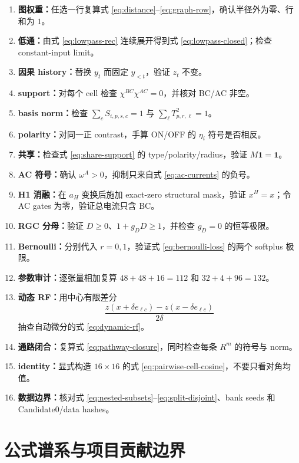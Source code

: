 \documentclass[UTF8,12pt,a4paper]{ctexart}
\numberwithin{equation}{section}
\newcommand{\vect}[1]{\bm{#1}}
\begin{document}
\begin{enumerate}[label=\textbf{V\arabic*.}]
\item \textbf{图权重：}任选一行复算式 \eqref{eq:distance}--\eqref{eq:graph-row}，确认半径外为零、行和为 $1$。
\item \textbf{低通：}由式 \eqref{eq:lowpass-rec} 连续展开得到式 \eqref{eq:lowpass-closed}；检查 constant-input limit。
\item \textbf{因果 history：}替换 $y_t$ 而固定 $y_{<t}$，验证 $z_t$ 不变。
\item \textbf{support：}对每个 cell 检查 $\chi^{BC}\chi^{AC}=0$，并核对 BC/AC 非空。
\item \textbf{basis norm：}检查 $\sum_cS_{i,p,s,c}=1$ 与 $\sum_\ell T_{p,r,\ell}^2=1$。
\item \textbf{polarity：}对同一正 contrast，手算 ON/OFF 的 $\eta_i$ 符号是否相反。
\item \textbf{共享：}检查式 \eqref{eq:share-support} 的 type/polarity/radius，验证 $M\vect1=\vect1$。
\item \textbf{AC 符号：}确认 $\omega^A>0$，抑制只来自式 \eqref{eq:ac-currents} 的负号。
\item \textbf{H1 消融：}在 $a_H$ 变换后施加 exact-zero structural mask，验证 $x^H=x$；令 AC gates 为零，验证总电流只含 BC。
\item \textbf{RGC 分母：}验证 $D\ge0$、$1+g_DD\ge1$，并检查 $g_D=0$ 的恒等极限。
\item \textbf{Bernoulli：}分别代入 $r=0,1$，验证式 \eqref{eq:bernoulli-loss} 的两个 softplus 极限。
\item \textbf{参数审计：}逐张量相加复算 $48+48+16=112$ 和 $32+4+96=132$。
\item \textbf{动态 RF：}用中心有限差分
\[
\frac{z(x+\delta e_{\ell c})-z(x-\delta e_{\ell c})}{2\delta}
\]
抽查自动微分的式 \eqref{eq:dynamic-rf}。
\item \textbf{通路闭合：}复算式 \eqref{eq:pathway-closure}，同时检查每条 $R^m$ 的符号与 norm。
\item \textbf{identity：}显式构造 $16\times16$ 的式 \eqref{eq:pairwise-cell-cosine}，不要只看对角均值。
\item \textbf{数据边界：}核对式 \eqref{eq:nested-subsets}--\eqref{eq:split-disjoint}、bank seeds 和 Candidate0/data hashes。
\end{enumerate}

\section{公式谱系与项目贡献边界}
\end{document}
